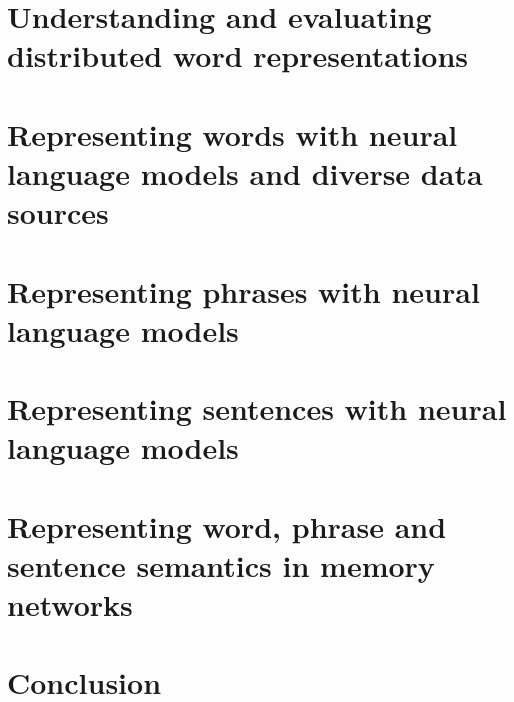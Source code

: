 \documentclass[withindex,glossary]{cam-thesis}
\begin{document}
\chapter{Understanding and evaluating distributed word representations}

\chapter{Representing words with neural language models and diverse data sources}

\chapter{Representing phrases with neural language models}

\chapter{Representing sentences with neural language models}

\chapter{Representing word, phrase and sentence semantics in memory networks}

\chapter{Conclusion}



\cleardoublepage
{}
{}





\appendix

\chapter{}



\chapter{}




\printthesisindex
\end{document}
